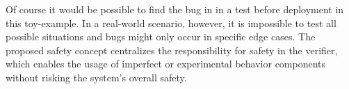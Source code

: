 Of course it would be possible to find the bug in  in a test before deployment in this toy-example.
In a real-world scenario, however, it is impossible to test all possible situations and bugs might only occur in specific edge cases.
The proposed safety concept centralizes the responsibility for safety in the verifier, which enables the usage of imperfect or experimental behavior components without risking the system's overall safety.

